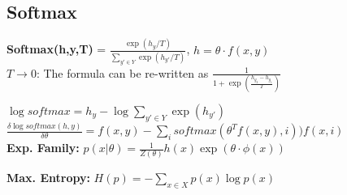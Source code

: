 \subsection{Softmax}
\textbf{Softmax(h,y,T)}  = $\frac{\exp(h_y/T)}{\sum_{y' \in Y} \exp(h_{y'}/T)}$, $h=\theta \cdot f(x,y)$\\
$T \rightarrow 0$: The formula can be re-written as $\frac{1}{1 + \exp(\frac{h_{y_2} - h_{y_1}}{T})}$\\
\begin{comment}
$T \rightarrow \infty$: The value of $h_y$ gets less and less important, it converges to a uniform distribution.\\
$T \rightarrow 0$: The formula can be re-written as $\frac{1}{1 + \exp(\frac{h_{y_2} - h_{y_1}}{T})}$. The difference of the h's get amplified by the small T value and therefore produce an argmax.\\
\end{comment} 


$\log softmax = h_y - \log \sum_{y' \in Y} \exp(h_{y'})$\\

$\frac{\delta \log softmax(h, y)}{\delta \theta} = f(x,y) - \sum_i softmax(\theta^T f(x,y), i)) f(x,i)$\\

\textbf{Exp. Family:} $p(x|\theta) = \frac{1}{Z(\theta)} h(x) \exp(\theta \cdot \phi(x))$\\
\begin{comment}
	This is the same as we have seen before, y is part of $\theta$, and $\phi$ is the feature function in our case.\\
	We like exponential distributions, because they have conjugate priors. This helps in Machine Learning tasks to get a "good" posterior which is explicitly computable.\\
\end{comment} 

\textbf{Max. Entropy:} $H(p) = -\sum_{x\in X} p(x) \log p(x)$\\
\begin{comment}
	Suppose we know the expectation, but not the underlying distribution. 
	We should always pick the distribution that, given the data, models the most uncertainty in unknown data points. This translates to probabilities closest together.
	This makes sure that we don't include bias. Laplace’s “Principle of Insufficient Reason” stipulates that if we have no reason to believe otherwise, we should assign equal probability to each event.\\
\end{comment} 
